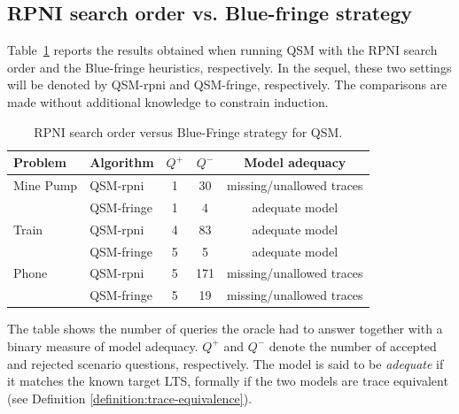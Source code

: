 
\subsection{RPNI search order vs. Blue-fringe strategy\label{subsection:evaluation-bluefringe-on-casestudies}}

Table~\ref{RPNI:Blue-fringe} reports the results obtained when running QSM with the RPNI search order and the Blue-fringe heuristics, respectively. In the sequel, these two settings will be denoted by QSM-rpni and QSM-fringe, respectively. The comparisons are made without additional knowledge to constrain induction. 

\begin{table}[H]
\centering
\begin{tabular}{|l||l||c|c|c|}\hline
Problem   & Algorithm   &$Q^+$&$Q^-$& Model adequacy\\\hline\hline
Mine Pump & QSM-rpni    & 1   & 30  & missing/unallowed traces\\\cline{2-5}
          & QSM-fringe  & 1   & 4   & adequate model\\\hline
Train     & QSM-rpni    & 4   & 83  & adequate model\\\cline{2-5}
          & QSM-fringe  & 5   & 5   & adequate model\\\hline
Phone     & QSM-rpni    & 5   & 171 & missing/unallowed traces\\\cline{2-5}
          & QSM-fringe  & 5   & 19  & missing/unallowed traces\\\hline
\end{tabular}
\caption{RPNI search order versus Blue-Fringe strategy for QSM.\label{RPNI:Blue-fringe}}
\end{table}

The table shows the number of queries the oracle had to answer together with a binary measure of model adequacy. $Q^+$ and $Q^-$ denote the number of accepted and rejected scenario questions, respectively. The model is said to be \emph{adequate} if it matches the known target LTS, formally if the two models are trace equivalent (see Definition \ref{definition:trace-equivalence}). 

